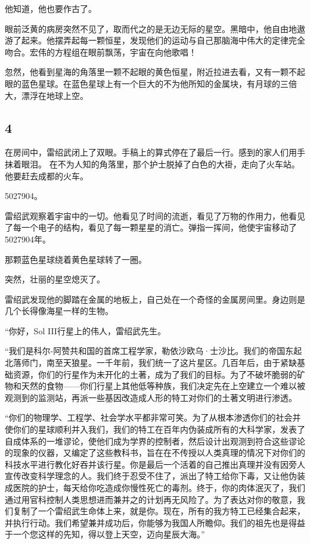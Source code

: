\documentclass[UTF8,12pt,oneside]{ctexbook}
\begin{document}
他知道，他也要作古了。

眼前泛黄的病房突然不见了，取而代之的是无边无际的星空。黑暗中，他自由地遨游了起来。他摆弄起每一颗恒星，发现他们的运动与自己那脑海中伟大的定律完全吻合。宏伟的方程组在眼前飘荡，宇宙在向他歌唱！

忽然，他看到星海的角落里一颗不起眼的黄色恒星，附近拉进去看，又有一颗不起眼的蓝色星球。在蓝色星球上有一个巨大的不为他所知的金属块，有月球的三倍大，漂浮在地球上空。

\subsection{4}

在房间中，雷绍武闭上了双眼。手稿上的算式停在了最后一行。感到的家人们用手抹着眼泪。
在不为人知的角落里，那个护士脱掉了白色的大褂，走向了火车站。他要赶去成都的火车。

5027904。

雷绍武观察着宇宙中的一切。他看见了时间的流逝，看见了万物的作用力，他看见了每一个电子的结构，看见了每一颗星星的消亡。弹指一挥间，他使宇宙移动了5027904年。

那颗蓝色星球绕着黄色星球转了一圈。

突然，壮丽的星空熄灭了。

雷绍武发现他的脚踏在金属的地板上，自己处在一个奇怪的金属房间里。身边则是几个长得像海星一样的生物。

“你好，Sol III行星上的伟人，雷绍武先生。

“我们是科尔-阿赞共和国的首席工程学家，勒依沙欧乌·士沙比。我们的帝国东起北落师门，南至天狼星。一千年前，我们统一了这片星区。几百年后，由于紧缺基础资源，你们的行星作为未开化的土著，成为了我们的目标。为了不破坏脆弱的矿物和天然的食物——你们行星上其他低等种族，我们决定先在上空建立一个难以被观测到的监测站，再派一些基因改造成人形的特工对你们的土著文明进行渗透。

“你们的物理学、工程学、社会学水平都非常可笑。为了从根本渗透你们的社会并使你们的星球顺利并入我们，我们的特工在百年内伪装成所有的大科学家，发表了自成体系的一堆谬论，使他们成为学界的控制者，然后设计出观测到符合这些谬论的现象的仪器，又编定了这些教科书，旨在在不传授以人类真理的情况下对你们的科技水平进行教化好吞并该行星。你是最后一个活着的自己推出真理并没有因旁人宣传改变科学理念的人。我们终于忍受不住了，派出了特工给你下毒，又让他伪装成医院的护士，每天给你吃造成你慢性死亡的毒剂。终于，你的肉体泯灭了，我们通过用官科控制人类思想进而兼并之的计划再无风险了。为了表达对你的敬意，我们复制了一个雷绍武生命体上来，就是你。现在，所有的我方特工已经集合起来，并执行行动。我们希望兼并成功后，你能够为我国人所瞻仰。我们的祖先也是得益于一个您这样的先知，得以登上天空，迈向星辰大海。”
\end{document}
